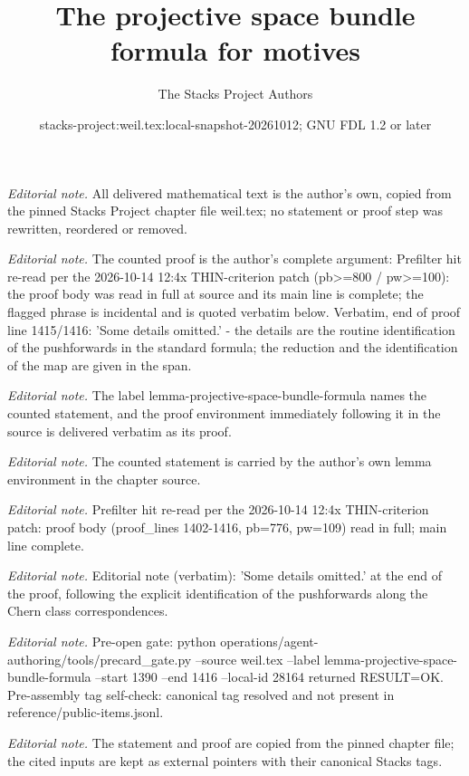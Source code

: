 \documentclass[10pt,a4paper]{amsart}
\title{The projective space bundle formula for motives}
\author{The Stacks Project Authors}
\date{stacks-project:weil.tex:local-snapshot-20261012; GNU FDL 1.2 or later}
\theoremstyle{plain}
\theoremstyle{definition}
\theoremstyle{remark}
\numberwithin{equation}{subsection}
\begin{document}
\maketitle
\noindent\textit{Editorial note.} All delivered mathematical text is the author's own, copied from the pinned Stacks Project chapter file weil.tex; no statement or proof step was rewritten, reordered or removed.\par\medskip
\noindent\textit{Editorial note.} The counted proof is the author's complete argument: Prefilter hit re-read per the 2026-10-14 12:4x THIN-criterion patch (pb>=800 / pw>=100): the proof body was read in full at source and its main line is complete; the flagged phrase is incidental and is quoted verbatim below. Verbatim, end of proof line 1415/1416: 'Some details omitted.'  -  the details are the routine identification of the pushforwards in the standard formula; the reduction and the identification of the map are given in the span.\par\medskip
\noindent\textit{Editorial note.} The label lemma-projective-space-bundle-formula names the counted statement, and the proof environment immediately following it in the source is delivered verbatim as its proof.\par\medskip
\noindent\textit{Editorial note.} The counted statement is carried by the author's own lemma environment in the chapter source.\par\medskip
\noindent\textit{Editorial note.} Prefilter hit re-read per the 2026-10-14 12:4x THIN-criterion patch: proof body (proof\_lines 1402-1416, pb=776, pw=109) read in full; main line complete.\par\medskip
\noindent\textit{Editorial note.} Editorial note (verbatim): 'Some details omitted.' at the end of the proof, following the explicit identification of the pushforwards along the Chern class correspondences.\par\medskip
\noindent\textit{Editorial note.} Pre-open gate: python operations/agent-authoring/tools/precard\_gate.py --source weil.tex --label lemma-projective-space-bundle-formula --start 1390 --end 1416 --local-id 28164 returned RESULT=OK. Pre-assembly tag self-check: canonical tag resolved and not present in reference/public-items.jsonl.\par\medskip
\noindent\textit{Editorial note.} The statement and proof are copied from the pinned chapter file; the cited inputs are kept as external pointers with their canonical Stacks tags.\par\medskip
\end{document}
